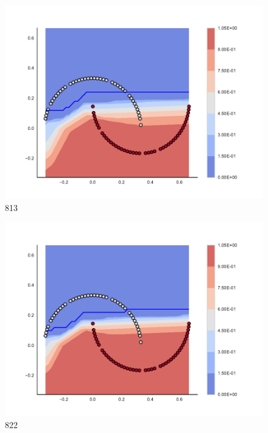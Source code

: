 \begin{subfigure}[b]{0.09\textwidth}
    \includegraphics[clip, trim=2.35cm 1.75cm 4.5cm 0cm,width=\textwidth]{img/convergence/813.pdf}
    \caption{813}
    \label{fig:convergence_813}
\end{subfigure}
%
\begin{subfigure}[b]{0.09\textwidth}
    \includegraphics[clip, trim=2.35cm 1.75cm 4.5cm 0cm,width=\textwidth]{img/convergence/822.pdf}
    \caption{822}
    \label{fig:convergence_822}
\end{subfigure}
%
